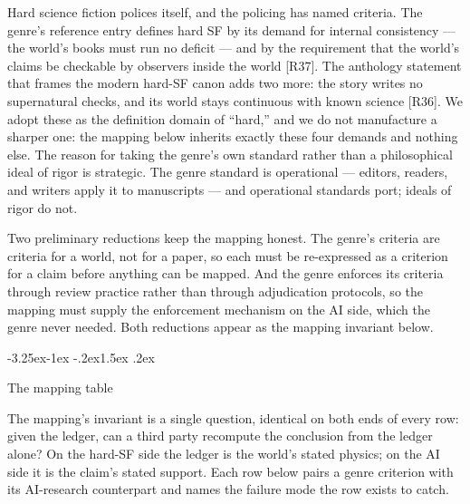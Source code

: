 \documentclass[11pt,a4paper]{article}
\makeatletter
\renewcommand\subsection{\@startsection{subsection}{2}{\z@}%
  {-3.25ex\@plus -1ex \@minus -.2ex}{1.5ex \@plus .2ex}%
  {\normalfont\large\bfseries\raggedright}}
\makeatother
\begin{document}
Hard science fiction polices itself, and the policing has named criteria. The genre's reference entry defines hard SF by its demand for internal consistency — the world's books must run no deficit — and by the requirement that the world's claims be checkable by observers inside the world [R37]. The anthology statement that frames the modern hard-SF canon adds two more: the story writes no supernatural checks, and its world stays continuous with known science [R36]. We adopt these as the definition domain of ``hard,'' and we do not manufacture a sharper one: the mapping below inherits exactly these four demands and nothing else. The reason for taking the genre's own standard rather than a philosophical ideal of rigor is strategic. The genre standard is operational — editors, readers, and writers apply it to manuscripts — and operational standards port; ideals of rigor do not.

Two preliminary reductions keep the mapping honest. The genre's criteria are criteria for a world, not for a paper, so each must be re-expressed as a criterion for a claim before anything can be mapped. And the genre enforces its criteria through review practice rather than through adjudication protocols, so the mapping must supply the enforcement mechanism on the AI side, which the genre never needed. Both reductions appear as the mapping invariant below.

\subsection{The mapping table}

The mapping's invariant is a single question, identical on both ends of every row: given the ledger, can a third party recompute the conclusion from the ledger alone? On the hard-SF side the ledger is the world's stated physics; on the AI side it is the claim's stated support. Each row below pairs a genre criterion with its AI-research counterpart and names the failure mode the row exists to catch.
\end{document}
